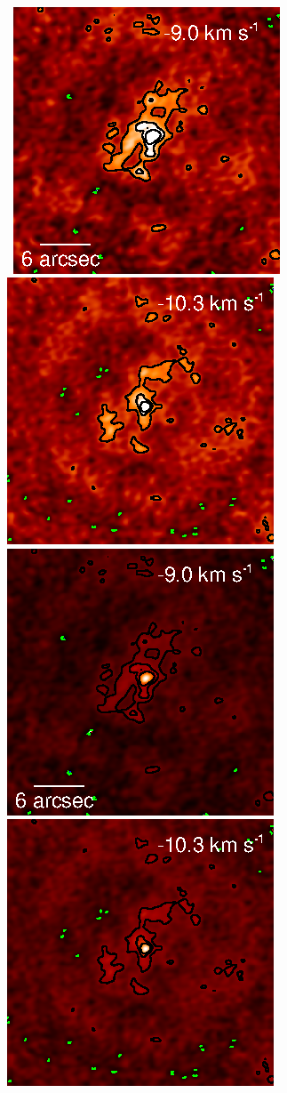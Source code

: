 \documentclass[preprint]{aastex}
\begin{document}
\begin{figure}%
\\
\mbox{
          \includegraphics[]{test34.ps}
          \includegraphics[]{test35.ps}
          \includegraphics[]{test_34.ps}
          \includegraphics[]{test_35.ps}
}
\end{figure}
\end{document}
